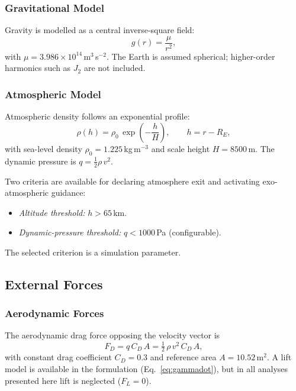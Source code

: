 \subsubsection{Gravitational Model}
\label{sssec:gravity}

Gravity is modelled as a central inverse-square field:
\begin{equation}
  g(r) = \frac{\mu}{r^2},
  \label{eq:gravity}
\end{equation}
with $\mu = 3.986\times10^{14}$\,m$^3$\,s$^{-2}$.  The Earth is assumed
spherical; higher-order harmonics such as $J_2$ are not included.

\subsubsection{Atmospheric Model}
\label{sssec:atmosphere}

Atmospheric density follows an exponential profile:
\begin{equation}
  \rho(h) = \rho_0\,\exp\!\left(-\frac{h}{H}\right),
  \qquad h = r - R_E,
  \label{eq:atmosphere}
\end{equation}
with sea-level density $\rho_0 = 1.225$\,kg\,m$^{-3}$ and scale height
$H = 8500$\,m.  The dynamic pressure is $q = \tfrac{1}{2}\rho\,v^2$.

Two criteria are available for declaring atmosphere exit and
activating exo-atmospheric guidance:
\begin{itemize}
  \item \emph{Altitude threshold:} $h > 65$\,km.
  \item \emph{Dynamic-pressure threshold:} $q < 1000$\,Pa (configurable).
\end{itemize}
The selected criterion is a simulation parameter.

\subsection{External Forces}
\label{ssec:forces}

\subsubsection{Aerodynamic Forces}
\label{sssec:aero}

The aerodynamic drag force opposing the velocity vector is
\begin{equation}
  F_D = q\,C_D\,A = \tfrac{1}{2}\,\rho\,v^2\,C_D\,A,
  \label{eq:drag}
\end{equation}
with constant drag coefficient $C_D = 0.3$ and reference area $A = 10.52$\,m$^2$.
A lift model is available in the formulation (Eq.~\ref{eq:gammadot}), but in
all analyses presented here lift is neglected ($F_L = 0$).

